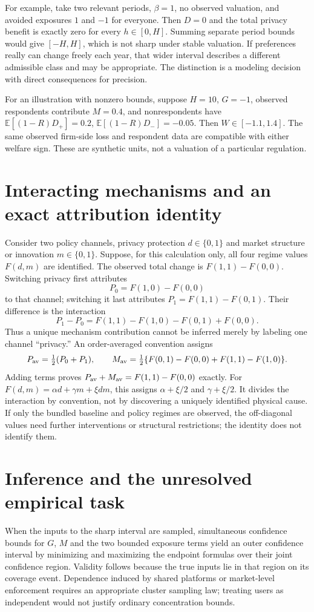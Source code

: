 \documentclass[11pt]{article}
\newcommand{\E}{\mathbb E}
\begin{document}
For example, take two relevant periods, $\beta=1$, no observed valuation, and avoided exposures $1$ and $-1$ for everyone. Then $D=0$ and the total privacy benefit is exactly zero for every $h\in[0,H]$. Summing separate period bounds would give $[-H,H]$, which is not sharp under stable valuation. If preferences really can change freely each year, that wider interval describes a different admissible class and may be appropriate. The distinction is a modeling decision with direct consequences for precision.

For an illustration with nonzero bounds, suppose $H=10$, $G=-1$, observed respondents contribute $M=0.4$, and nonrespondents have $\E[(1-R)D_+]=0.2$, $\E[(1-R)D_-]=-0.05$. Then $W\in[-1.1,1.4]$. The same observed firm-side loss and respondent data are compatible with either welfare sign. These are synthetic units, not a valuation of a particular regulation.

\section*{Interacting mechanisms and an exact attribution identity}
Consider two policy channels, privacy protection $d\in\{0,1\}$ and market structure or innovation $m\in\{0,1\}$. Suppose, for this calculation only, all four regime values $F(d,m)$ are identified. The observed total change is $F(1,1)-F(0,0)$. Switching privacy first attributes
\[
 P_0=F(1,0)-F(0,0)
\]
to that channel; switching it last attributes
$P_1=F(1,1)-F(0,1)$. Their difference is the interaction
\[
 P_1-P_0=F(1,1)-F(1,0)-F(0,1)+F(0,0).
\]
Thus a unique mechanism contribution cannot be inferred merely by labeling one channel ``privacy.'' An order-averaged convention assigns
\[
 P_{\rm av}=\tfrac12(P_0+P_1),\qquad
 M_{\rm av}=\tfrac12\{F(0,1)-F(0,0)+F(1,1)-F(1,0)\}.
\]
Adding terms proves $P_{\rm av}+M_{\rm av}=F(1,1)-F(0,0)$ exactly. For $F(d,m)=\alpha d+\gamma m+\xi dm$, this assigns $\alpha+\xi/2$ and $\gamma+\xi/2$. It divides the interaction by convention, not by discovering a uniquely identified physical cause. If only the bundled baseline and policy regimes are observed, the off-diagonal values need further interventions or structural restrictions; the identity does not identify them.

\section*{Inference and the unresolved empirical task}
When the inputs to the sharp interval are sampled, simultaneous confidence bounds for $G$, $M$ and the two bounded exposure terms yield an outer confidence interval by minimizing and maximizing the endpoint formulas over their joint confidence region. Validity follows because the true inputs lie in that region on its coverage event. Dependence induced by shared platforms or market-level enforcement requires an appropriate cluster sampling law; treating users as independent would not justify ordinary concentration bounds.
\end{document}
